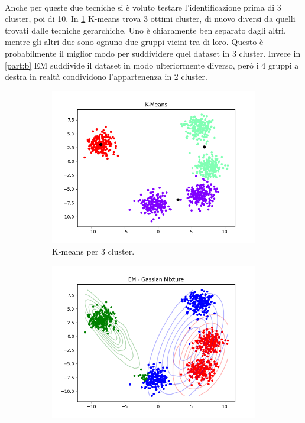 \documentclass{llncs}
\begin{document}
	\\
	Anche per queste due tecniche si è voluto testare l'identificazione prima di 3 cluster, poi di 10. In \ref{part:a} K-means trova 3 ottimi cluster, di nuovo diversi da quelli trovati dalle tecniche gerarchiche.
	Uno è chiaramente ben separato dagli altri, mentre gli altri due sono ognuno due gruppi vicini tra di loro. Questo è probabilmente il miglior modo per suddividere quel dataset in 3 cluster. 
	Invece in \ref{part:b} EM suddivide il dataset in modo ulteriormente diverso, però i 4 gruppi a destra in realtà condividono l'appartenenza in 2 cluster.
	\begin{figure}[h]
		\begin{subfigure}{.5\textwidth}
		  \centering
		  \includegraphics[width=\linewidth]{immagini/5_clusters_kmeans_3.png}
		  \caption{K-means per 3 cluster.}
		  \label{part:a}
		\end{subfigure}%
		\begin{subfigure}{.5\textwidth}
		  \centering
		  \includegraphics[width=\linewidth]{immagini/5_clusters_gmm_3.png}

\end{subfigure}
\end{figure}
\end{document}
